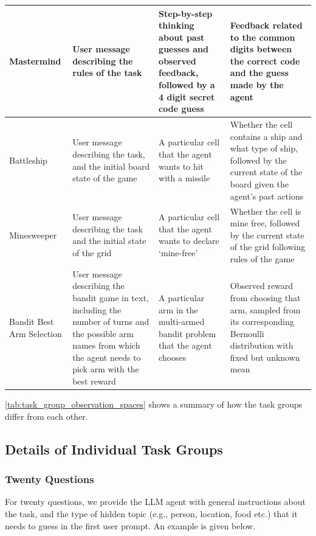 \begin{table}[h!]
\begin{tabular}{|l|p{4cm}|p{4cm}|p{4cm}|}
\hline
Mastermind & User message describing the rules of the task & Step-by-step thinking about past guesses and observed feedback, followed by a 4 digit secret code guess & Feedback related to the common digits between the correct code and the guess made by the agent \\
\hline
Battleship & User message describing the task, and the initial board state of the game & A particular cell that the agent wants to hit with a missile & Whether the cell contains a ship and what type of ship, followed by the current state of the board given the agent's past actions \\
\hline
Minesweeper & User message describing the task and the initial state of the grid & A particular cell that the agent wants to declare `mine-free’ & Whether the cell is mine free, followed by the current state of the grid following rules of the game \\
\hline
Bandit Best Arm Selection & User message describing the bandit game in text, including the number of turns and the possible arm names from which the agent needs to pick arm with the best reward & A particular arm in the multi-armed bandit problem that the agent chooses & Observed reward from choosing that arm, sampled from its corresponding Bernoulli distribution with fixed but unknown mean \\
\hline
\end{tabular}
\end{table}

\cref{tab:task_group_observation_spaces} shows a summary of how the task groups differ from each other.

\newpage

\subsection{Details of Individual Task Groups}

\subsubsection{Twenty Questions}

For twenty questions, we provide the LLM agent with general instructions about the task, and the type of hidden topic (e.g., person, location, food etc.) that it needs to guess in the first user prompt. An example is given below.

